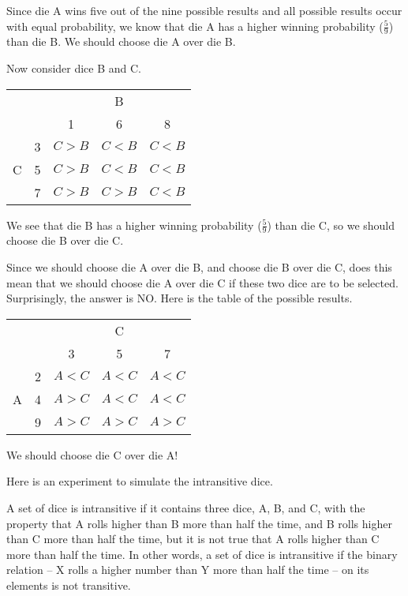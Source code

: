 Since die A wins five out of the nine possible results and all possible results occur with equal probability, we know that die A has a higher winning probability ($\frac{5}{9}$) than die B. We should choose die A over die B. 

Now consider dice B and C.
\begin{center}
  \begin{tabular}{cc|ccc}\hline
    &   & \multicolumn{3}{c}{B} \\
    &   & 1                & 6                & 8                \\ \hline
    \multirow{3}{*}{C}
    & 3 & \color{red}$C>B$ & $C<B$            & $C<B$            \\
    & 5 & \color{red}$C>B$ & $C<B$            & $C<B$            \\
    & 7 & \color{red}$C>B$ & \color{red}$C>B$ & $C<B$ \\\hline
  \end{tabular}
\end{center}

We see that die B has a higher winning probability ($\frac{5}{9}$) than die C, so we should choose die B over die C. 

Since we should choose die A over die B, and choose die B over die C, does this mean that we should choose die A over die C if these two dice are to be selected. Surprisingly, the answer is NO. Here is the table of the possible results.
\begin{center}
  \begin{tabular}{cc|ccc}\hline
    &   & \multicolumn{3}{c}{C} \\
    &   & 3                & 5                & 7                \\ \hline
    \multirow{3}{*}{A}
    & 2 & $A<C$            & $A<C$            & $A<C$            \\
    & 4 & \color{red}$A>C$ & $A<C$            & $A<C$            \\
    & 9 & \color{red}$A>C$ & \color{red}$A>C$ & \color{red}$A>C$ \\\hline
  \end{tabular}
\end{center}
We should choose die C over die A!

Here is an experiment to simulate the intransitive dice.



A set of dice is intransitive if it contains three dice, A, B, and C, with the property that A rolls higher than B more than half the time, and B rolls higher than C more than half the time, but it is not true that A rolls higher than C more than half the time. In other words, a set of dice is intransitive if the binary relation – X rolls a higher number than Y more than half the time – on its elements is not transitive.

